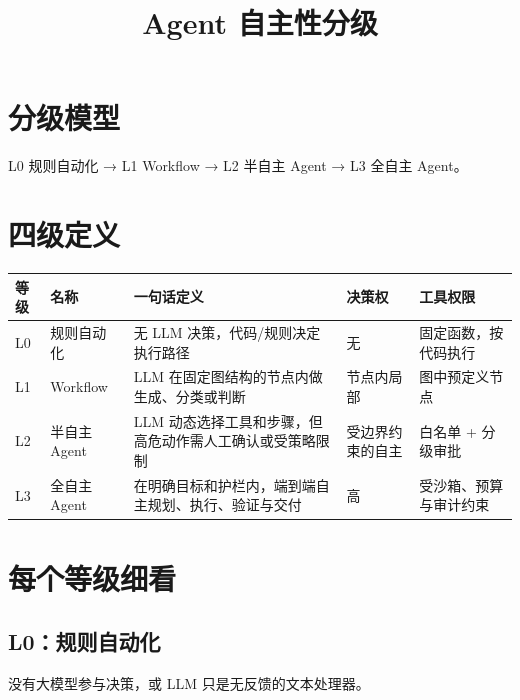 \documentclass[9pt,a4paper,twocolumn]{ctexart}
\begin{document}
\title{Agent 自主性分级}
\date{}
\maketitle
{}

\section*{分级模型}


L0 规则自动化 → L1 Workflow → L2 半自主 Agent → L3 全自主 Agent。



\section*{四级定义}

{\footnotesize
\begin{tabular}{|p{}|p{}|p{}|p{}|p{}|}
\hline
\textbf{等级} & \textbf{名称} & \textbf{一句话定义} & \textbf{决策权} & \textbf{工具权限} \\
\hline
L0 & 规则自动化 & 无 LLM 决策，代码/规则决定执行路径 & 无 & 固定函数，按代码执行 \\
\hline
L1 & Workflow & LLM 在固定图结构的节点内做生成、分类或判断 & 节点内局部 & 图中预定义节点 \\
\hline
L2 & 半自主 Agent & LLM 动态选择工具和步骤，但高危动作需人工确认或受策略限制 & 受边界约束的自主 & 白名单 + 分级审批 \\
\hline
L3 & 全自主 Agent & 在明确目标和护栏内，端到端自主规划、执行、验证与交付 & 高 & 受沙箱、预算与审计约束 \\
\hline
\end{tabular}
}



\section*{每个等级细看}


\subsection*{L0：规则自动化}


没有大模型参与决策，或 LLM 只是无反馈的文本处理器。
\end{document}
